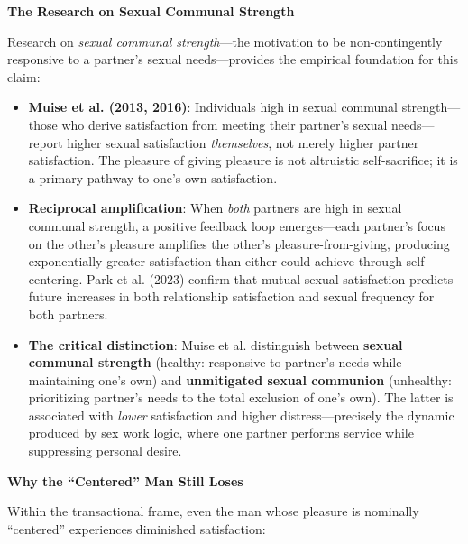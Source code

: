 \documentclass[12pt,openany]{book}
\numberwithin{equation}{chapter}
\begin{document}
\textbf{The Research on Sexual Communal Strength}

Research on \textit{sexual communal strength}---the motivation to be non-contingently responsive to a partner's sexual needs---provides the empirical foundation for this claim:

\begin{itemize}
    \item \textbf{Muise et al. (2013, 2016)}: Individuals high in sexual communal strength---those who derive satisfaction from meeting their partner's sexual needs---report higher sexual satisfaction \textit{themselves}, not merely higher partner satisfaction. The pleasure of giving pleasure is not altruistic self-sacrifice; it is a primary pathway to one's own satisfaction.
    
    \item \textbf{Reciprocal amplification}: When \textit{both} partners are high in sexual communal strength, a positive feedback loop emerges---each partner's focus on the other's pleasure amplifies the other's pleasure-from-giving, producing exponentially greater satisfaction than either could achieve through self-centering. Park et al. (2023) confirm that mutual sexual satisfaction predicts future increases in both relationship satisfaction and sexual frequency for both partners.
    
    \item \textbf{The critical distinction}: Muise et al. distinguish between \textbf{sexual communal strength} (healthy: responsive to partner's needs while maintaining one's own) and \textbf{unmitigated sexual communion} (unhealthy: prioritizing partner's needs to the total exclusion of one's own). The latter is associated with \textit{lower} satisfaction and higher distress---precisely the dynamic produced by sex work logic, where one partner performs service while suppressing personal desire.
\end{itemize}

\textbf{Why the ``Centered'' Man Still Loses}

Within the transactional frame, even the man whose pleasure is nominally ``centered'' experiences diminished satisfaction:
\end{document}
